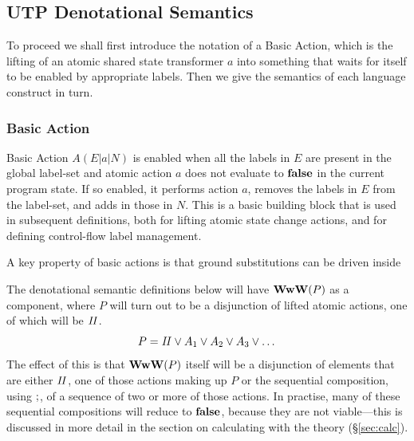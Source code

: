 \subsection{UTP Denotational Semantics}\label{ssec:UTP-denote}



To proceed we shall first introduce the notation of a Basic Action,
which is the lifting of an atomic shared state transformer $a$
into something that waits for itself to be enabled by appropriate labels.
Then we give the semantics of each language construct in turn.


\subsubsection{Basic Action}\label{sssec:basic-action}

Basic Action $A(E|a|N)$ is enabled when all the labels in $E$ are present in
the global label-set and atomic action $a$ does not evaluate to $\mathbf{false}$ in
the current program state. If so enabled,  it performs action $a$, removes
the labels in $E$ from the label-set, and adds in those in $N$.
 This is a basic building block that is used in subsequent definitions, both
for lifting atomic state change actions, and for defining control-flow label
management.

A key property of basic actions is that ground substitutions
can be driven inside

The denotational semantic definitions below will have
$\mathbf{WwW}(P)$ as a component,
where $P$ will turn out to be a disjunction of lifted atomic actions,
one of which will be $\mathit{II}$.
\[
  P = \mathit{II} \lor A_1 \lor A_2 \lor A_3 \lor \dots
\]
The effect of this is that $\mathbf{WwW}(P)$ itself
will be a disjunction of elements that are
either $\mathit{II}$, one of those actions making up $P$
or the sequential composition, using $\mathrel{;}$,
of a sequence of two or more of those actions.
In practise, many of these sequential compositions will reduce to $\mathbf{false}$,
because they are not viable---this is discussed in more detail in the section
on calculating with the theory (\S\ref{sec:calc}).

